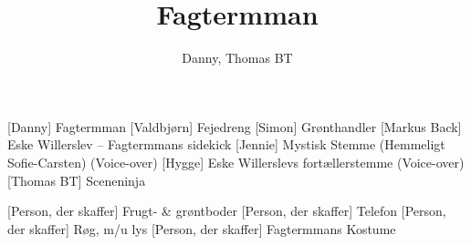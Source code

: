 \documentclass[a4paper,11pt]{article}
\title{Fagtermman}
\author{Danny, Thomas BT}
\begin{document}
\maketitle

\begin{roles}
    [Danny] Fagtermman
    [Valdbjørn] Fejedreng
    [Simon] Grønthandler
    [Markus Back] Eske Willerslev -- Fagtermmans sidekick
    [Jennie] Mystisk Stemme (Hemmeligt Sofie-Carsten) (Voice-over)
    [Hygge] Eske Willerslevs fortællerstemme (Voice-over)
    [Thomas BT] Sceneninja
\end{roles}

\begin{props}
    [Person, der skaffer] Frugt- \& grøntboder
    [Person, der skaffer] Telefon
    [Person, der skaffer] Røg, m/u lys
    [Person, der skaffer] Fagtermmans Kostume
\end{props}
\end{document}
